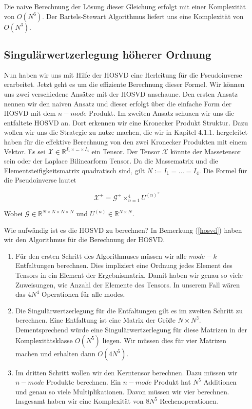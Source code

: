 Die naive Berechnung der Lösung dieser Gleichung erfolgt mit einer Komplexität von $O(N^6)$. Der Bartels-Stewart Algorithmus \cite{Bartels} liefert uns eine Komplexität von $O(N^3)$. 

\subsection{Singulärwertzerlegung höherer Ordnung}
Nun haben wir uns mit Hilfe der HOSVD eine Herleitung für die Pseudoinverse erarbeitet. Jetzt geht es um die effiziente Berechnung dieser Formel. Wir können uns zwei verschiedene Ansätze mit der HOSVD anschaune. Den ersten Ansatz nennen wir den naiven Ansatz und dieser erfolgt über die einfache Form der HOSVD mit dem $n-mode$ Produkt. Im zweiten Ansatz schuaen wir uns die entfaltete HOSVD an. Dort erkennen wir eine Kronecker Produkt Struktur. Dazu wollen wir uns die Strategie zu nutze machen, die wir in Kapitel 4.1.1. hergeleitet haben für die effektive Berechnung von den zwei Kronecker Produkten mit einem Vektor.
Es sei $\mathscr{X} \in \mathbb{R}^{I_1 \times \dots \times I_{4}}$ ein Tensor. Der Tensor $\mathscr{X}$ könnte der Massetensor sein oder der Laplace Bilinearform Tensor. Da die Massematrix und die Elementsteifigkeitsmatrix quadratisch sind, gilt $N:= I_1 = \dots = I_4$.
Die Formel für die Pseudoinverse lautet

\begin{equation} \label{eq:pinv}
\mathscr{X}^{+} = \mathscr{G}^{+} \times_{n=1}^{4} U^{ (n) ^{T} }
\end{equation}

Wobei $\mathscr{G} \in \mathbb{R}^{N \times N \times N \times N}$ und $U^{(n)} \in \mathbb{R}^{N \times N}$.

Wie aufwändig ist es die HOSVD zu berechnen?
In Bemerkung (\ref{hosvd}) haben wir den Algorithmus für die Berechnung der HOSVD. 
\begin{enumerate}
\item Für den ersten Schritt des Algorithmuses müssen wir alle $mode-k$ Entfaltungen berechnen. Dies impliziert eine Ordnung jedes Element des Tensors in ein Element der Ergebnismatrix. Damit haben wir genau so viele Zuweisungen, wie Anzahl der Elemente des Tensors. In unserem Fall wären das $4N^4$ Operationen für alle modes. 

\item Die Singulärwertzerlegung für die Entfaltungen gilt es im zweiten Schritt zu berechnen. Eine Entfaltung ist eine Matrix der Größe $N \times N^3$. Dementsprechend würde eine Singulärwertzerlegung für diese Matrizen in der Komplexitätsklasse $O(N^5)$ liegen. Wir müssen dies für vier Matrizen machen und erhalten dann $O(4N^5)$.

\item Im dritten Schritt wollen wir den Kerntensor berechnen. Dazu müssen wir $n-mode$ Produkte berechnen. Ein $n-mode$ Produkt hat $N^5$ Additionen und genau so viele Multiplikationen. Davon müssen wir vier berechnen. Insgesamt haben wir eine Komplexität von $8N^5$ Rechenoperationen.

\end{enumerate}

